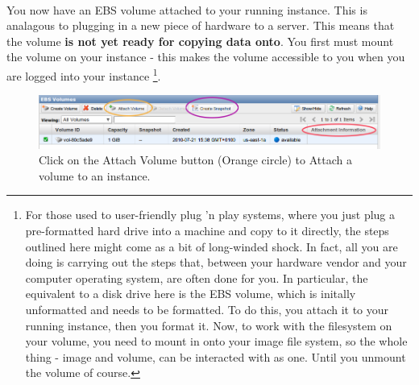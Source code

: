 \paragraph{}You now have an EBS volume attached to your running instance. This is analagous to plugging in a new piece of hardware to a server. This means that the volume \textbf{is not yet ready for copying data onto}. You first must mount the volume on your instance - this makes the volume accessible to you when you are logged into your instance \footnote{For those used to user-friendly plug 'n play systems, where you just plug a pre-formatted hard drive into a machine and copy to it directly, the steps outlined here might come as a bit of long-winded shock. In fact, all you are doing is carrying out the steps that, between your hardware vendor and your computer operating system, are often done for you. In particular, the equivalent to a disk drive here is the EBS volume, which is initally unformatted and needs to be formatted. To do this, you attach it to your running instance, then you format it. Now, to work with the filesystem on your volume, you need to mount in onto your image file system, so the whole thing - image and volume, can be interacted with as one. Until you unmount the volume of course.}. 

\begin{figure}[!hd]
	\fbox
	{
		\begin{minipage}{13cm}
\includegraphics[width=\maxwidth]{"images/attachVolume-1"}
\caption[Attaching a volume]{\label{fig:attachvolume1}Click on the Attach Volume button (Orange circle) to Attach a volume to an instance.}
		\end{minipage}
	}	
\end{figure}


